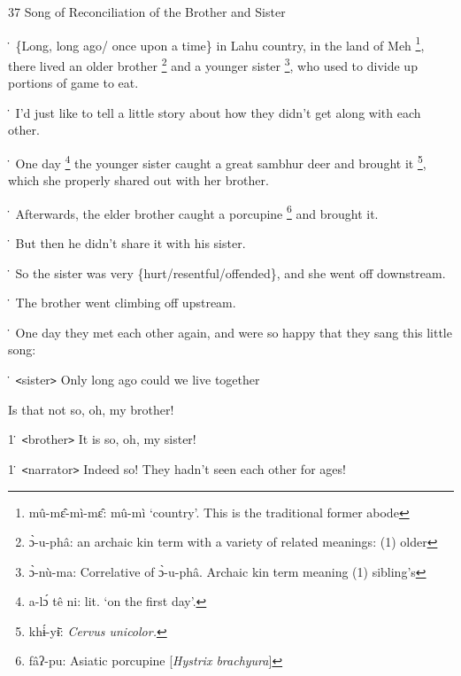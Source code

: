 
37 Song of Reconciliation of the Brother and Sister

\. \{Long, long ago/ once upon a time\} in Lahu country, in the land of Meh \footnote{mû-mɛ̂-mì-mɛ̂: mû-mì `country'. This is the traditional former abode},
there lived an older brother \footnote{ɔ̀-u-phâ: an archaic kin term with a variety of related meanings: (1) older} and a younger sister \footnote{ɔ̀-nù-ma: Correlative of ɔ̀-u-phâ. Archaic kin term meaning (1) sibling's}, who used to divide up
portions of game to eat.

\. I'd just like to tell a little story about how they didn't get along with each
other.

\. One day \footnote{a-lɔ́ tê ni: lit. `on the first day'.} the younger sister caught a great sambhur deer and brought it \footnote{khɨ́-yɨ̄: \textit{Cervus unicolor.}},
which she properly shared out with her brother.

\. Afterwards, the elder brother caught a porcupine \footnote{fâʔ-pu: Asiatic porcupine [\textit{Hystrix brachyura}]} and brought it.

\. But then he didn't share it with his sister.

\. So the sister was very \{hurt/resentful/offended\}, and she went off downstream.

\. The brother went climbing off upstream.

\. One day they met each other again, and were so happy that they sang this little
song:

\. \texttt{<}sister\texttt{>} Only long ago could we live together

Is that not so, oh, my brother!

1\. \texttt{<}brother\texttt{>} It is so, oh, my sister!

1\. \texttt{<}narrator\texttt{>} Indeed so! They hadn't seen each other for ages!
